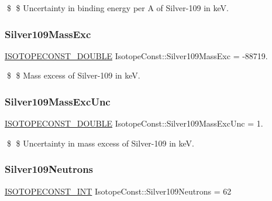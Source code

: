 \$ \$ Uncertainty in binding energy per A of Silver-\/109 in keV. \mbox{\label{group___isotope_const-_silver-_ag109_ga0cc2da79fa9854bde4153cb1c45bdadd}} 
\subsubsection{\texorpdfstring{Silver109\+Mass\+Exc}{Silver109MassExc}}
{\footnotesize\ttfamily \mbox{\hyperlink{group___isotope_const-_macros_ga8f45a7272ce02c0b4c65c44636ed719a}{I\+S\+O\+T\+O\+P\+E\+C\+O\+N\+S\+T\+\_\+\+D\+O\+U\+B\+LE}} Isotope\+Const\+::\+Silver109\+Mass\+Exc = -\/88719.}

\$ \$ Mass excess of Silver-\/109 in keV. \mbox{\label{group___isotope_const-_silver-_ag109_gab2cb5dcf7c156f449febb581b333296c}} 
\subsubsection{\texorpdfstring{Silver109\+Mass\+Exc\+Unc}{Silver109MassExcUnc}}
{\footnotesize\ttfamily \mbox{\hyperlink{group___isotope_const-_macros_ga8f45a7272ce02c0b4c65c44636ed719a}{I\+S\+O\+T\+O\+P\+E\+C\+O\+N\+S\+T\+\_\+\+D\+O\+U\+B\+LE}} Isotope\+Const\+::\+Silver109\+Mass\+Exc\+Unc = 1.}

\$ \$ Uncertainty in mass excess of Silver-\/109 in keV. \mbox{\label{group___isotope_const-_silver-_ag109_ga5bf4d68a389e8d452e3843b223ca7039}} 
\subsubsection{\texorpdfstring{Silver109\+Neutrons}{Silver109Neutrons}}
{\footnotesize\ttfamily \mbox{\hyperlink{group___isotope_const-_macros_ga5f18360b3e99483a35c32d789e62621c}{I\+S\+O\+T\+O\+P\+E\+C\+O\+N\+S\+T\+\_\+\+I\+NT}} Isotope\+Const\+::\+Silver109\+Neutrons = 62}


